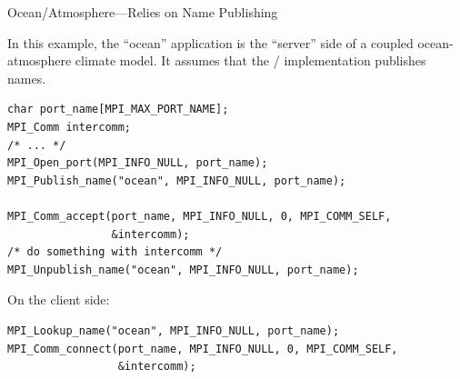 \begin{example}
%
Ocean/Atmosphere---Relies on Name Publishing

\noindent

In this example, the ``ocean'' application is the ``server''
side of a coupled ocean-atmosphere climate model. It assumes
that the \MPI/ implementation publishes names.

\begin{lstlisting}[language={[MPI]C}]
char port_name[MPI_MAX_PORT_NAME];
MPI_Comm intercomm;
/* ... */
MPI_Open_port(MPI_INFO_NULL, port_name);
MPI_Publish_name("ocean", MPI_INFO_NULL, port_name);

MPI_Comm_accept(port_name, MPI_INFO_NULL, 0, MPI_COMM_SELF,
                &intercomm);
/* do something with intercomm */
MPI_Unpublish_name("ocean", MPI_INFO_NULL, port_name);
\end{lstlisting}
On the client side:
\begin{lstlisting}[language={[MPI]C}]
MPI_Lookup_name("ocean", MPI_INFO_NULL, port_name);
MPI_Comm_connect(port_name, MPI_INFO_NULL, 0, MPI_COMM_SELF,
                 &intercomm);
\end{lstlisting}
\end{example}

